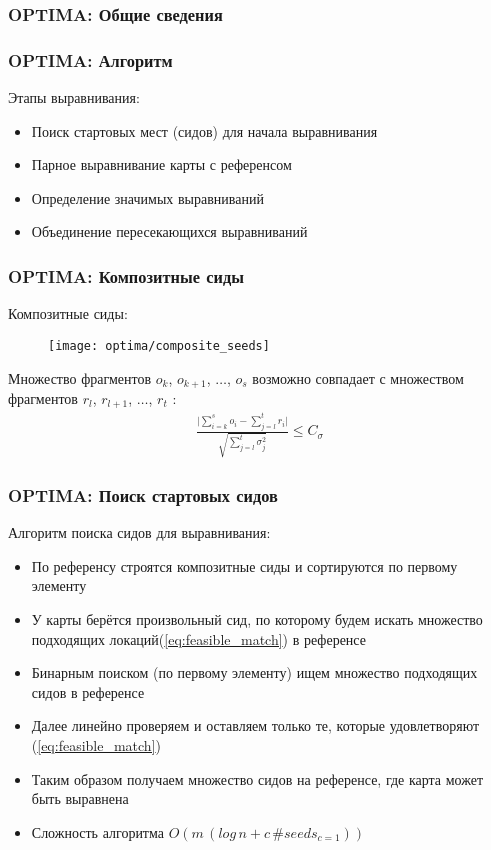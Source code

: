 \begin{frame}
\frametitle{OPTIMA: Общие сведения}


\end{frame}

\begin{frame}
\frametitle{OPTIMA: Алгоритм}

Этапы выравнивания:
\begin{itemize}
  \item Поиск стартовых мест (сидов) для начала выравнивания
  \item Парное выравнивание карты с референсом
  \item Определение значимых выравниваний
  \item Объединение пересекающихся выравниваний
\end{itemize}

\end{frame}

\begin{frame}
\frametitle{OPTIMA: Композитные сиды}
Композитные сиды:
\begin{figure}
  \centering
  \texttt{[image: optima/composite\_seeds]}
\end{figure}
Множество фрагментов $o_k$, $o_{k + 1}$, $ \dots$, $o_{s}$ возможно
совпадает с множеством фрагментов $r_l$, $r_{l+1}$, $\dots$, $r_{t}$ :
\begin{gather}
\frac{\bigg|\sum\limits_{i = k}^s o_i - \sum\limits_{j = l}^t r_i \bigg|}{\sqrt{\sum\limits_{j = l}^t\sigma_j^2}} \le C_{\sigma}
\label{eq:feasible_match}
\end{gather}

\end{frame}

\begin{frame}
\frametitle{OPTIMA: Поиск стартовых сидов}
Алгоритм поиска сидов для выравнивания:
\begin{itemize}
  \item По референсу строятся композитные сиды и сортируются по первому элементу
  \item У карты берётся произвольный сид, по которому будем искать множество подходящих локаций(\ref{eq:feasible_match}) в референсе
  \item Бинарным поиском (по первому элементу) ищем множество подходящих сидов в референсе
  \item Далее линейно проверяем и оставляем только те, которые удовлетворяют (\ref{eq:feasible_match})
  \item Таким образом получаем множество сидов на референсе, где карта может быть выравнена
  \item Сложность алгоритма $O(m \, (log \, n + c \, \#seeds_{c=1}))$
\end{itemize}
\end{frame}

